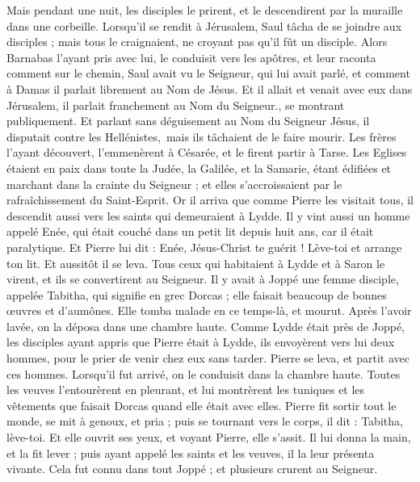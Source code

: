 \begin{multicols}{2}
Mais pendant une nuit, les disciples le prirent, et le descendirent par la muraille dans une corbeille.
Lorsqu’il se rendit à Jérusalem, Saul tâcha de se joindre aux disciples ; mais tous le craignaient, ne croyant pas qu'il fût un disciple.
Alors Barnabas l’ayant pris avec lui, le conduisit vers les apôtres, et leur raconta comment sur le chemin, Saul avait vu le Seigneur, qui lui avait parlé, et comment à Damas il parlait librement au Nom de Jésus.
Et il allait et venait avec eux dans Jérusalem, il parlait franchement au Nom du Seigneur., se montrant publiquement.
Et parlant sans déguisement au Nom du Seigneur Jésus, il disputait contre les Hellénistes, mais ils tâchaient de le faire mourir.
Les frères l’ayant découvert, l’emmenèrent à Césarée, et le firent partir à Tarse.
Les Eglises étaient en paix dans toute la Judée, la Galilée, et la Samarie, étant édifiées et marchant dans la crainte du Seigneur ; et elles s’accroissaient par le rafraîchissement du Saint-Esprit.
Or il arriva que comme Pierre les visitait tous, il descendit aussi vers les saints qui demeuraient à Lydde.
Il y vint aussi un homme appelé Enée, qui était couché dans un petit lit depuis huit ans, car il était paralytique.
Et Pierre lui dit : Enée, Jésus-Christ te guérit ! Lève-toi et arrange ton lit. Et aussitôt il se leva.
Tous ceux qui habitaient à Lydde et à Saron le virent, et ils se convertirent au Seigneur.
Il y avait à Joppé une femme disciple, appelée Tabitha, qui signifie en grec Dorcas ; elle faisait beaucoup de bonnes œuvres et d'aumônes.
Elle tomba malade en ce temps-là, et mourut. Après l’avoir lavée, on la déposa dans une chambre haute.
Comme Lydde était près de Joppé, les disciples ayant appris que Pierre était à Lydde, ils envoyèrent vers lui deux hommes, pour le prier de venir chez eux sans tarder.
Pierre se leva, et partit avec ces hommes. Lorsqu’il fut arrivé, on le conduisit dans la chambre haute. Toutes les veuves l’entourèrent en pleurant, et lui montrèrent les tuniques et les vêtements que faisait Dorcas quand elle était avec elles.
Pierre fit sortir tout le monde, se mit à genoux, et pria ; puis se tournant vers le corps, il dit : Tabitha, lève-toi. Et elle ouvrit ses yeux, et voyant Pierre, elle s’assit.
Il lui donna la main, et la fit lever ; puis ayant appelé les saints et les veuves, il la leur présenta vivante.
Cela fut connu dans tout Joppé ; et plusieurs crurent au Seigneur.

\end{multicols}

